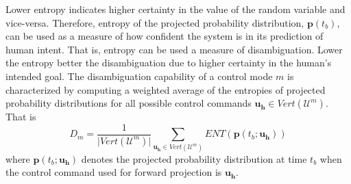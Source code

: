 \documentclass[conference]{IEEEtran}
\begin{document}
Lower entropy indicates higher certainty in the value of the random variable and vice-versa. Therefore, entropy of the projected probability distribution, $\boldsymbol{p}(t_b)$, can be used as a measure of how confident the system is in its prediction of human intent. That is, entropy can be used a measure of disambiguation. Lower the entropy better the disambiguation due to higher certainty in the human's intended goal. The disambiguation capability of a control mode $m$ is characterized by computing a weighted average of the entropies of projected probability distributions for all possible control commands $\boldsymbol{u_h} \in Vert(\mathcal{U}^m)$. That is
\begin{equation}
D_m = \frac{1}{\vert Vert(\mathcal{U}^m) \vert}\sum_{\boldsymbol{u_h} \in Vert(\mathcal{U}^m)}  ENT(\boldsymbol{p}(t_b; \boldsymbol{u_h}))
\end{equation}
where $\boldsymbol{p}(t_b; \boldsymbol{u_h})$ denotes the projected probability distribution at time $t_b$ when the control command used for forward projection is $\boldsymbol{u_h}$.
\end{document}
